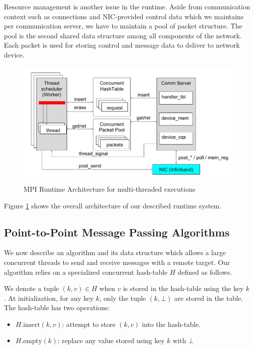 \documentclass[11pt]{article}
\begin{document}
Resource management is another issue in the runtime. Aside from communication
context such as connections and NIC-provided control data which we maintains
per communication server, we have to maintain a pool of packet structure. The
pool is the second shared data structure among all components of the network.
Each packet is used for storing control and message data to deliver to network
device.

\begin{figure}
  \centering
  \includegraphics[width=\textwidth]{fig/runtime.pdf}
  \caption{MPI Runtime Architecture for multi-threaded executions}\label{fig:overall}
\end{figure}

Figure \ref{fig:overall} shows the overall architecture of our described
runtime system.

\subsection{Point-to-Point Message Passing Algorithms}
We now describe an algorithm and its data structure which allows a large
concurrent threads to send and receive messages with a remote target. Our
algorithm relies on a specialized concurrent hash-table $H$ defined as follows.

We denote a tuple $(k,v) \in H$ when $v$ is stored in the hash-table using the
key $k$. At initialization, for any key $k$, only the tuple $(k,\bot)$ are
stored in the table. The hash-table has two operations: 

\begin{itemize}
  \item $H.\text{insert}(k,v)$: attempt to store $(k,v)$ into the hash-table.
  \item $H.\text{empty}(k)$: replace any value stored using key $k$ with $\bot$
\end{itemize}
\end{document}
